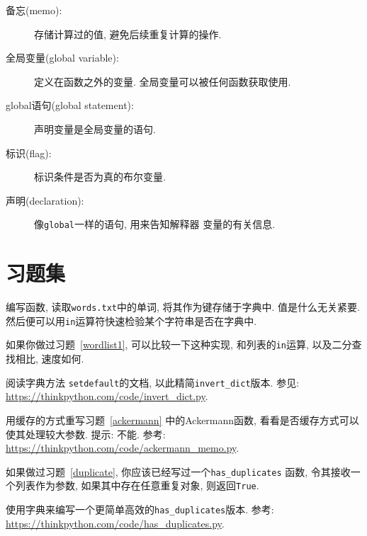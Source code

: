 \documentclass[10pt]{book}
\begin{document}
\begin{description}
\item[备忘(memo):] 存储计算过的值, 避免后续重复计算的操作. 

\item[全局变量(global variable):] 定义在函数之外的变量. 
全局变量可以被任何函数获取使用. 

\item[global语句(global statement):] 声明变量是全局变量的语句.

\item[标识(flag):] 标识条件是否为真的布尔变量. 

\item[声明(declaration):] 像{\tt global}一样的语句, 用来告知解释器
变量的有关信息. 

\end{description}


\section{习题集}

\begin{exercise}
\label{wordlist2}

编写函数, 读取{\tt words.txt}中的单词, 
将其作为键存储于字典中. 值是什么无关紧要. 
然后便可以用{\tt in}运算符快速检验某个字符串是否在字典中. 

如果你做过习题~\ref{wordlist1}, 可以比较一下这种实现, 和列表的{\tt in}运算, 
以及二分查找相比, 速度如何. 

\end{exercise}


\begin{exercise}
\label{setdefault}
阅读字典方法 {\tt setdefault}的文档, 
以此精简\verb"invert_dict"版本. 
参见: \url{https://thinkpython.com/code/invert_dict.py}.

\end{exercise}


\begin{exercise}
用缓存的方式重写习题~\ref{ackermann} 中的Ackermann函数, 
看看是否缓存方式可以使其处理较大参数. 
提示: 不能.
参考: \url{https://thinkpython.com/code/ackermann_memo.py}.

\end{exercise}


\begin{exercise}
如果做过习题~\ref{duplicate}, 你应该已经写过一个\verb"has_duplicates" 函数, 
令其接收一个列表作为参数, 如果其中存在任意重复对象, 则返回{\tt True}.

使用字典来编写一个更简单高效的\verb"has_duplicates"版本. 
参考: \url{https://thinkpython.com/code/has_duplicates.py}.
\end{exercise}
\end{document}
